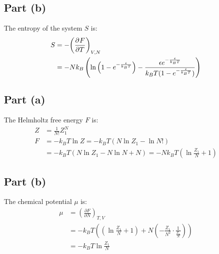 \documentclass{article}
\begin{document}
\subsection*{Part (b)}
The entropy of the system $S$ is:
\begin{equation}
    \begin{split}
        S & = -{\left(\frac{\partial^{}F} {\partial T^{}}\right)}_{V,N} \\
        & = -Nk_B\left(\ln\left(1 - e^{-\frac{\epsilon}{k_BT}}\right) - \frac{\epsilon e^{-\frac{\epsilon}{k_BT}}}{k_BT(1 - e^{-\frac{\epsilon}{k_BT}})}\right)
    \end{split}
\end{equation}

\clearpage

\subsection*{Part (a)}
The Helmholtz free energy $F$ is:
\begin{equation}
    \begin{split}
        Z & = \frac{1}{N!}Z_1^N \\
        F & = -k_BT\ln Z = -k_BT\left(N\ln Z_1 - \ln N!\right) \\
        & = -k_BT\left(N\ln Z_1 - N\ln N + N\right) = -Nk_BT\left(\ln\frac{Z_1}{N} + 1\right)
    \end{split}
\end{equation}
\subsection*{Part (b)}
The chemical potential $\mu$ is:
\begin{equation}
    \begin{split}
        \mu & = {\left(\frac{\partial F}{\partial N}\right)}_{T,V} \\
        & = -k_BT\left(\left(\ln\frac{Z_1}{N} + 1\right) + N\left(-\frac{Z_1}{N^2} \cdot \frac{1}{\frac{Z_1}{N}}\right)\right) \\
        & = -k_BT\ln\frac{Z_1}{N}
    \end{split}
\end{equation}
\end{document}
